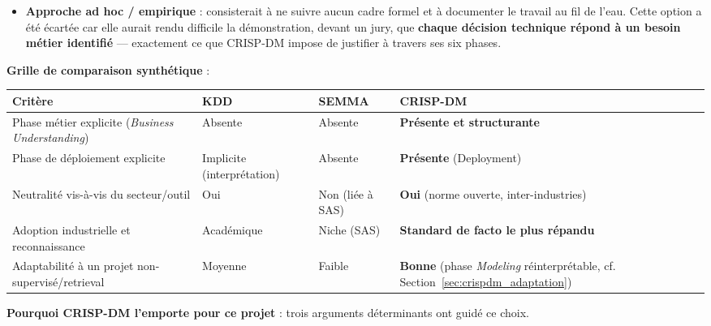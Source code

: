 \documentclass[12pt,a4paper]{report}
\begin{document}
\begin{itemize}
  \item \textbf{Approche ad hoc / empirique} : consisterait à ne suivre aucun cadre formel et à documenter le travail au fil de l'eau. Cette option a été écartée car elle aurait rendu difficile la démonstration, devant un jury, que \textbf{chaque décision technique répond à un besoin métier identifié} --- exactement ce que CRISP-DM impose de justifier à travers ses six phases.
\end{itemize}

\textbf{Grille de comparaison synthétique} :

\begin{longtable}{p{2.6cm}p{3.6cm}p{3.6cm}p{3.7cm}}
\toprule
\textbf{Critère} & \textbf{KDD} & \textbf{SEMMA} & \textbf{CRISP-DM} \\
\midrule
Phase métier explicite (\textit{Business Understanding}) & Absente & Absente & \textbf{Présente et structurante} \\
Phase de déploiement explicite & Implicite (interprétation) & Absente & \textbf{Présente} (Deployment) \\
Neutralité vis-à-vis du secteur/outil & Oui & Non (liée à SAS) & \textbf{Oui} (norme ouverte, inter-industries) \\
Adoption industrielle et reconnaissance & Académique & Niche (SAS) & \textbf{Standard de facto le plus répandu} \\
Adaptabilité à un projet non-supervisé/retrieval & Moyenne & Faible & \textbf{Bonne} (phase \textit{Modeling} réinterprétable, cf. Section~\ref{sec:crispdm_adaptation}) \\
\bottomrule
\end{longtable}

\textbf{Pourquoi CRISP-DM l'emporte pour ce projet} : trois arguments déterminants ont guidé ce choix.
\end{document}
